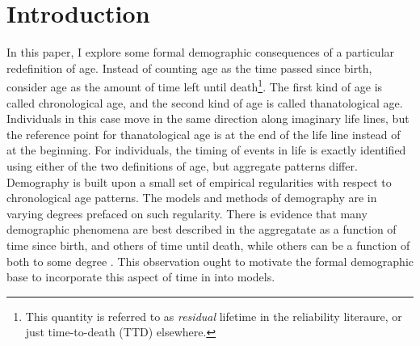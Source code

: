 \documentclass{article}
\begin{document}
\section*{Introduction}
In this paper, I explore some formal demographic consequences of a particular redefinition of age. Instead of counting age as the time passed since birth, consider age as the amount of time left until death\footnote{This quantity is referred to as \textit{residual} lifetime
in the reliability literaure, or just time-to-death (TTD) elsewhere.}. The first
kind of age is called chronological age, and the second kind of age is called
thanatological age. Individuals in this case move in the same direction along
imaginary life lines, but the reference point for thanatological age is at
the end of the life line instead of at the beginning. For individuals, the timing of events in life is exactly identified using either of the two definitions of age, but
aggregate patterns differ. Demography is built upon a small set of empirical
regularities with respect to chronological age patterns. The models and methods
of demography are in varying degrees prefaced on such regularity. There is evidence that many demographic phenomena are best described in the
aggregatate as a function of time since birth, and others of time until death,
while others can be a function of both to some degree
\citep{riffe2015ttd,wolf2015disability}. This observation ought to motivate the
formal demographic base to incorporate this aspect of time in into models. 
\end{document}
